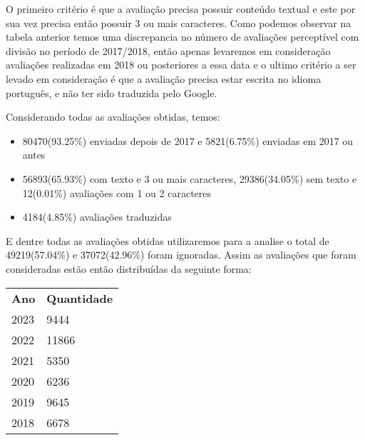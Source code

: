 O primeiro critério é que a avaliação precisa possuir conteúdo textual e este por sua vez precisa então possuir 3 ou mais caracteres. Como podemos observar na tabela anterior temos uma discrepancia no número de avaliações perceptível com divisão no período de 2017/2018, então apenas levaremos em consideração avaliações realizadas em 2018 ou posteriores a essa data e o ultimo critério a ser levado em consideração é que a avaliação precisa estar escrita no idioma português, e não ter sido traduzida pelo Google.

Considerando todas as avaliações obtidas, temos:

\begin{itemize}
	\item 80470(93.25\%) enviadas depois de 2017 e 5821(6.75\%) enviadas em 2017 ou antes
	\item 56893(65.93\%) com texto e 3 ou mais caracteres, 29386(34.05\%) sem texto e 12(0.01\%) avaliações com 1 ou 2 caracteres
	\item 4184(4.85\%) avaliações traduzidas
\end{itemize}

E dentre todas as avaliações obtidas utilizaremos para a analise o total de 49219(57.04\%) e 37072(42.96\%) foram ignoradas. Assim as avaliações que foram consideradas estão então distribuídas da seguinte forma:
\begin{table}[H]
	\centering
	\begin{tabular}{l|l}
		\textbf{Ano} & \textbf{Quantidade} \\
		2023         & 9444                \\
		2022         & 11866               \\
		2021         & 5350                \\
		2020         & 6236                \\
		2019         & 9645                \\
		2018         & 6678
	\end{tabular}
\end{table}

